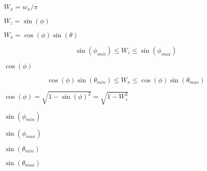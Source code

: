 \documentclass{article}
\begin{document}
$W_x = w_x/\pi$
\pagebreak

$W_z = \sin(\phi)$
\pagebreak

$W_x = \cos(\phi) \sin(\theta)$
\pagebreak

\[ \sin(\phi_{min}) \leq W_z \leq \sin(\phi_{max}) \]
\pagebreak

$\cos(\phi)$
\pagebreak

\[ \cos(\phi)\sin(\theta_{min}) \leq W_x \leq \cos(\phi) \sin(\theta_{max}) \]
\pagebreak

$\cos(\phi) = \sqrt{1 - \sin(\phi)^2} = \sqrt{1 - W_z^2}$
\pagebreak

$\sin(\phi_{min})$
\pagebreak

$\sin(\phi_{max})$
\pagebreak

$\sin(\theta_{min})$
\pagebreak

$\sin(\theta_{max})$
\pagebreak
\end{document}
